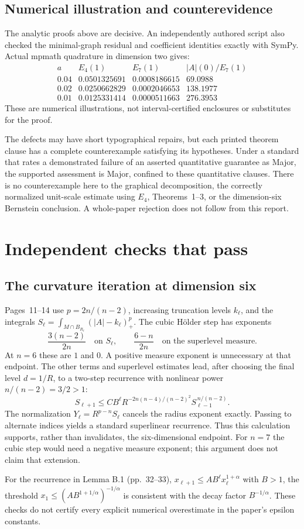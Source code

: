 \documentclass[10pt]{article}
\begin{document}
\subsection*{Numerical illustration and counterevidence}
The analytic proofs above are decisive. An independently authored script also checked the minimal-graph residual and coefficient identities exactly with SymPy. Actual mpmath quadrature in dimension two gives: \[\begin{array}{c|ccc}
 a&E_4(1)&E_7(1)&|A|(0)/E_7(1)\\ \hline
 0.04&0.0501325691&0.0008186615&69.0988\\
 0.02&0.0250662829&0.0002046653&138.1977\\
 0.01&0.0125331414&0.0000511663&276.3953
\end{array}\] These are numerical illustrations, not interval-certified enclosures or substitutes for the proof.\par
The defects may have short typographical repairs, but each printed theorem clause has a complete counterexample satisfying its hypotheses. Under a standard that rates a demonstrated failure of an asserted quantitative guarantee as Major, the supported assessment is Major, confined to these quantitative clauses. There is no counterexample here to the graphical decomposition, the correctly normalized unit-scale estimate using \(E_4\), Theorems 1–3, or the dimension-six Bernstein conclusion. A whole-paper rejection does not follow from this report.\par
\section*{Independent checks that pass}
\subsection*{The curvature iteration at dimension six}
Pages 11–14 use \(p=2n/(n-2)\), increasing truncation levels \(k_\ell\), and the integrals \(S_\ell=\int_{M\cap B_{R_\ell}}(|A|-k_\ell)_+^p\). The cubic Hölder step has exponents \[\frac{3(n-2)}{2n}\quad\text{on }S_\ell,\qquad
 \frac{6-n}{2n}\quad\text{on the superlevel measure}.\] At \(n=6\) these are \(1\) and \(0\). A positive measure exponent is unnecessary at that endpoint. The other terms and superlevel estimates lead, after choosing the final level \(d=1/R\), to a two-step recurrence with nonlinear power \(n/(n-2)=3/2>1\): \[S_{\ell+1}\le C B^\ell
 R^{-2n(n-4)/(n-2)^2}S_{\ell-1}^{\,n/(n-2)}.\] The normalization \(Y_\ell=R^{p-n}S_\ell\) cancels the radius exponent exactly. Passing to alternate indices yields a standard superlinear recurrence. Thus this calculation supports, rather than invalidates, the six-dimensional endpoint. For \(n=7\) the cubic step would need a negative measure exponent; this argument does not claim that extension.\par
For the recurrence in Lemma B.1 (pp. 32–33), \(x_{\ell+1}\le AB^\ell x_\ell^{1+\alpha}\) with \(B>1\), the threshold \(x_1\le(AB^{1+1/\alpha})^{-1/\alpha}\) is consistent with the decay factor \(B^{-1/\alpha}\). These checks do not certify every explicit numerical overestimate in the paper’s epsilon constants.\par
\end{document}
